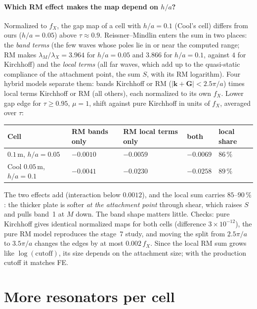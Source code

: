 \paragraph{Which RM effect makes the map depend on $h/a$?} Normalized to $f_X$, the gap
map of a cell with $h/a = 0.1$ (Cool's cell) differs from ours ($h/a = 0.05$) above
$\tau \approx 0.9$. Reissner--Mindlin enters the sum in two places: the \emph{band terms}
(the few waves whose poles lie in or near the computed range; RM makes
$\lambda_M/\lambda_X = 3.964$ for $h/a = 0.05$ and $3.866$ for $h/a = 0.1$, against $4$
for Kirchhoff) and the \emph{local terms} (all far waves, which add up to the
quasi-static compliance of the attachment point, the sum $S$, with its RM logarithm).
Four hybrid models separate them: bands Kirchhoff or RM ($|\mathbf{k}+\mathbf{G}| <
2.5\pi/a$) times local terms Kirchhoff or RM (all others), each normalized to its own
$f_X$. Lower gap edge for $\tau \ge 0.95$, $\mu = 1$, shift against pure Kirchhoff in
units of $f_X$, averaged over $\tau$:
\begin{center}
\begin{tabular}{|l|l|l|l|l|}
\hline
Cell & RM bands only & RM local terms only & both & local share \\
\hline
$0.1\,\mathrm{m}$, $h/a = 0.05$ & $-0.0010$ & $-0.0059$ & $-0.0069$ & $86\,\%$ \\
Cool $0.05\,\mathrm{m}$, $h/a = 0.1$ & $-0.0041$ & $-0.0230$ & $-0.0258$ & $89\,\%$ \\
\hline
\end{tabular}
\end{center}
The two effects add (interaction below $0.0012$), and the local sum carries
$85$--$90\,\%$: the thicker plate is softer \emph{at the attachment point} through
shear, which raises $S$ and pulls band~1 at $M$ down. The band shape matters little.
Checks: pure Kirchhoff gives identical normalized maps for both cells (difference
$3 \times 10^{-12}$), the pure RM model reproduces the stage~7 study, and moving the
split from $2.5\pi/a$ to $3.5\pi/a$ changes the edges by at most $0.002\,f_X$. Since the
local RM sum grows like $\log(\text{cutoff})$, its size depends on the attachment
size; with the production cutoff it matches FE.

\section{More resonators per cell}

